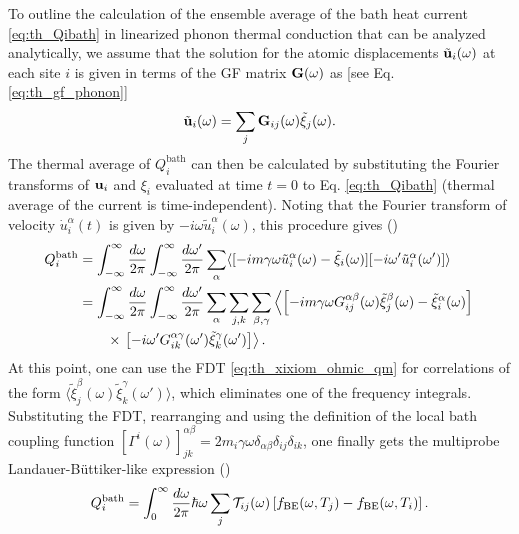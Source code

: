 To outline the calculation of the ensemble average of the bath heat current \eqref{eq:th_Qibath} in linearized phonon thermal conduction that can be analyzed analytically, we assume that the solution for the atomic displacements $\tilde{\mathbf{u}}_i(\omega)$ at each site $i$ is given in terms of the GF matrix $\mathbf{G}(\omega)$ as [see Eq. \eqref{eq:th_gf_phonon}]
\begin{equation}
 \tilde{\mathbf{u}}_i(\omega) = \sum_{j} \mathbf{G}_{ij}(\omega) \tilde{\xi}_j(\omega).
\end{equation}
The thermal average of $Q_i^{\textrm{bath}}$ can then be calculated by substituting the Fourier transforms of $\mathbf{u}_i$ and $\xi_i$ evaluated at time $t=0$ to Eq. \eqref{eq:th_Qibath} (thermal average of the current is time-independent). Noting that the Fourier transform of velocity $\dot{u}_i^{\alpha}(t)$ is given by $-i\omega \tilde{u}^{\alpha}_i(\omega)$, this procedure gives ()
\begin{alignat}{2}
 Q_i^{\textrm{bath}}  &= \int_{-\infty}^{\infty} \frac{d\omega}{2\pi} \int_{-\infty}^{\infty} \frac{d\omega'}{2\pi} \sum_{\alpha} \langle  [ -im\gamma\omega \tilde u_i^{\alpha}(\omega)-\tilde \xi_i(\omega)][-i\omega' \tilde u_i^{\alpha}(\omega')] \rangle \\
  &= \int_{-\infty}^{\infty} \frac{d\omega}{2\pi} \int_{-\infty}^{\infty} \frac{d\omega'}{2\pi} \sum_{\alpha} \sum_{j,k} \sum_{\beta,\gamma} \left\langle \left[ -im\gamma\omega G_{ij}^{\alpha\beta}(\omega)\tilde \xi_j^{\beta}(\omega)-\tilde \xi_i^{\alpha}(\omega) \right] \right. \notag \\
  &\qquad \times \left.\left[-i\omega' G_{ik}^{\alpha\gamma}(\omega') \tilde \xi_k^{\gamma}(\omega') \right]  \right\rangle .
\end{alignat}
At this point, one can use the FDT \eqref{eq:th_xixiom_ohmic_qm} for correlations of the form $\langle \tilde \xi_j^{\beta}(\omega)\tilde \xi_k^{\gamma}(\omega') \rangle$, which eliminates one of the frequency integrals. Substituting the FDT, rearranging and using the definition of the local bath coupling function $[\Gamma^i(\omega)]_{jk}^{\alpha\beta}=2m_i\gamma\omega \delta_{\alpha\beta}\delta_{ij} \delta_{ik}$, one finally gets the multiprobe Landauer-B\"uttiker-like \cite{landauer57,buttiker92} expression ()
\begin{equation}
  Q_i^{\textrm{bath}} = \int_0^{\infty} \frac{d\omega}{2\pi} \hbar \omega  \sum_j \mathcal{T}_{ij}(\omega) \left[ f_{\textrm{BE}}(\omega,T_j)- f_{\textrm{BE}}(\omega,T_i)\right]. \label{eq:th_QI}
\end{equation}
